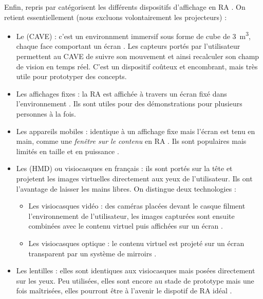 Enfin, \cite{Buxton1998} repris par \cite{Bimber2005} catégorisent les différents dispositifs d'affichage en RA . On retient essentiellement (nous excluons volontairement les projecteurs) :
\begin{itemize}
  \item Le  (CAVE) : c'est un environnment immersif sous forme de cube de \SI{3}{\m^{3}}, chaque face comportant un écran . Les capteurs portés par l'utilisateur permettent au CAVE de suivre son mouvement et ainsi recalculer son champ de vision en temps réel. C'est un dispositif coûteux et encombrant, mais très utile pour prototyper des concepts.
  \item Les affichages fixes : la RA est affichée à travers un écran fixé dans l'environnement . Ils sont utiles pour des démonstrations pour plusieurs personnes à la fois.
  \item Les appareils mobiles : identique à un affichage fixe mais l'écran est tenu en main, comme une \emph{fenêtre sur le contenu} en RA . Ils sont populaires mais limités en taille et en puissance \citep{Huang2013}.
  \item Les  (HMD) ou visiocasques en français : ils sont portés sur la tête et projetent les images virtuelles directement aux yeux de l'utilisateur. Ils ont l'avantage de laisser les mains libres. On distingue deux technologies :
  \begin{itemize}
    \item Les visiocasques vidéo : des caméras placées devant le casque filment l'environnement de l'utilisateur, les images capturées sont ensuite combinées avec le contenu virtuel puis affichées sur un écran .
    \item Les visiocasques optique : le contenu virtuel est projeté sur un écran transparent par un système de mirroirs .
  \end{itemize}
  \item Les lentilles : elles sont identiques aux visiocasques mais posées directement sur les yeux. Peu utilisées, elles sont encore au stade de prototype mais une fois maîtrisées, elles pourront être à l'avenir le dispotif de RA idéal \citep{VanKrevelen2010}.
\end{itemize}
\medskip


